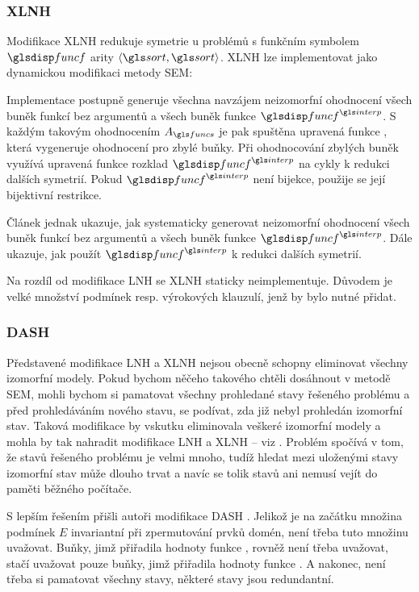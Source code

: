 \subsubsection{XLNH}

Modifikace XLNH \cite{xlnh} redukuje symetrie u problémů
s funkčním symbolem $\func$ arity $\langle \sort, \sort \rangle$.
XLNH lze implementovat jako dynamickou modifikaci metody SEM:

Implementace postupně generuje všechna navzájem
neizomorfní ohodnocení všech buněk
funkcí bez argumentů a všech buněk funkce $\func^\interp$.
S každým takovým ohodnocením $A_\funcs$ je pak spuštěna upravená funkce
, která vygeneruje ohodnocení pro zbylé buňky.
Při ohodnocování zbylých buněk využívá upravená funkce 
rozklad $\func^\interp$ na cykly
k redukci dalších symetrií. Pokud $\func^\interp$ není bijekce,
použije se její bijektivní restrikce.

Článek \cite{xlnh} jednak ukazuje, jak systematicky
generovat neizomorfní ohodnocení všech buněk
funkcí bez argumentů a všech buněk funkce $\func^\interp$.
Dále ukazuje, jak použít $\func^\interp$ k redukci dalších symetrií.

Na rozdíl od modifikace LNH se XLNH staticky neimplementuje.
Důvodem je velké množství podmínek resp. výrokových klauzulí,
jenž by bylo nutné přidat.

\subsubsection{DASH}

Představené modifikace LNH a XLNH nejsou obecně schopny eliminovat všechny
izomorfní modely. Pokud bychom něčeho takového chtěli dosáhnout
v metodě SEM, mohli bychom si pamatovat všechny prohledané
stavy řešeného problému a před prohledáváním nového stavu,
se podívat, zda již nebyl prohledán izomorfní stav.
Taková modifikace by vskutku eliminovala veškeré izomorfní modely
a mohla by tak nahradit modifikace LNH a XLNH -- viz
\cite{audemard2001symmetry}.
Problém spočívá v tom, že stavů řešeného problému
je velmi mnoho, tudíž hledat mezi uloženými stavy izomorfní stav může
dlouho trvat a navíc se tolik stavů ani nemusí vejít do paměti
běžného počítače.

S lepším řešením přišli autoři modifikace DASH \cite{dash}.
Jelikož je na začátku množina podmínek $E$ invariantní
při zpermutování prvků domén, není třeba tuto množinu uvažovat.
Buňky, jimž přiřadila hodnoty funkce ,
rovněž není třeba uvažovat, stačí uvažovat pouze buňky,
jimž přiřadila hodnoty funkce .
A nakonec, není třeba si pamatovat všechny stavy,
některé stavy jsou redundantní.

